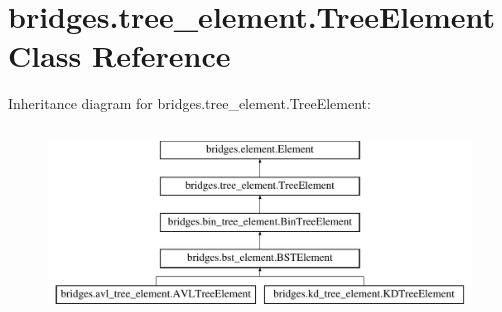 \hypertarget{classbridges_1_1tree__element_1_1_tree_element}{}\section{bridges.\+tree\+\_\+element.\+Tree\+Element Class Reference}
\label{classbridges_1_1tree__element_1_1_tree_element}
Inheritance diagram for bridges.\+tree\+\_\+element.\+Tree\+Element\+:\begin{figure}[H]
\begin{center}
\leavevmode
\includegraphics[height=5.000000cm]{classbridges_1_1tree__element_1_1_tree_element}
\end{center}
\end{figure}
